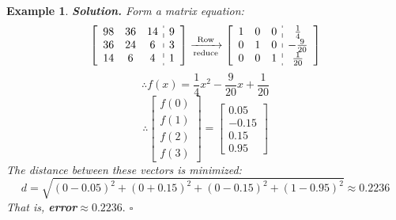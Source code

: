 \documentclass[12pt, a4paper]{article}
\newtheorem{eg}{Example}[subsection]
\newenvironment*{sol}{\indent\textbf{Solution. }}{\hfill{$\square$}\par}
\begin{document}
\begin{eg}
\begin{sol}
		Form a matrix equation: 
		\[\left[\begin{array}{c:c}\begin{matrix}98&36&14\\36&24&6\\14&6&4\end{matrix}&\begin{matrix}9\\3\\1\end{matrix}\end{array}\right]\xrightarrow[\text{reduce}]{\text{Row}}\left[\begin{array}{c:c}\begin{matrix}1&0&0\\0&1&0\\0&0&1\end{matrix}&\begin{matrix}\frac{1}{4}\\-\frac{9}{20}\\\frac{1}{20}\end{matrix}\end{array}\right]\]
		\[\therefore f(x)=\frac{1}{4}x^2-\frac{9}{20}x+\frac{1}{20}\]
		\[\therefore \begin{bmatrix}f(0)\\f(1)\\f(2)\\f(3)\end{bmatrix}=\begin{bmatrix}0.05\\-0.15\\0.15\\0.95\end{bmatrix}\]
		The distance between these vectors is minimized: 
		\[d=\sqrt{(0-0.05)^2+(0+0.15)^2+(0-0.15)^2+(1-0.95)^2}\approx0.2236\]
		That is, \textbf{error}$\approx0.2236.$
	\end{sol}
\end{eg}
\end{document}
